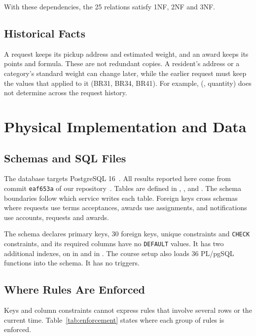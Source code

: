 \documentclass[11pt,letterpaper]{article}
\newcommand{\evidencecommit}{eaf653a} %
\begin{document}
With these dependencies, the 25 relations satisfy 1NF, 2NF and 3NF.

\subsection{Historical Facts}
A request keeps its pickup address and estimated weight, and an award keeps its points and formula. These are not redundant copies. A resident's address or a category's standard weight can change later, while the earlier request must keep the values that applied to it (BR31, BR34, BR41). For example, (, quantity) does not determine  across the request history.

\section{Physical Implementation and Data}
\label{sec:physical}
\subsection{Schemas and SQL Files}
The database targets PostgreSQL 16~\cite{postgres}. All results reported here come from commit \texttt{\evidencecommit} of our repository~\cite{repo}. Tables are defined in , ,  and . The schema boundaries follow which service writes each table. Foreign keys cross schemas where requests use terms acceptances, awards use assignments, and notifications use accounts, requests and awards.

The schema declares primary keys, 30 foreign keys, unique constraints and \texttt{CHECK} constraints, and its required columns have no \texttt{DEFAULT} values. It has two additional indexes, on  in  and in . The course setup also loads 36 PL/pgSQL functions into the  schema. It has no triggers.

\subsection{Where Rules Are Enforced}
Keys and column constraints cannot express rules that involve several rows or the current time. Table~\ref{tab:enforcement} states where each group of rules is enforced.
\end{document}
